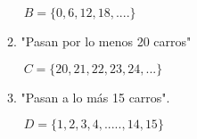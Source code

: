 \documentclass[12pt]{article}
\begin{document}
\begin{enumerate}
\begin{enumerate}[A; ]
$\ B=\lbrace0,6,12,18,....\rbrace$

\item "Pasan por lo menos 20 carros"

$\ C=\lbrace20,21,22,23,24,...\rbrace$

\item "Pasan a lo más 15 carros".
 
$\ D=\lbrace1,2,3,4,.....,14,15\rbrace$

\end{enumerate}



\end{enumerate}
\end{document}
